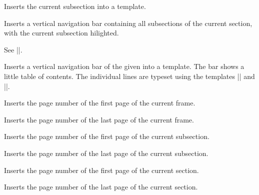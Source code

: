 \begin{command}{\insertsubsection}
  Inserts the current subsection into a template.
\end{command}

\begin{command}{\insertsubsectionnavigation{}}
  Inserts a vertical navigation bar containing all subsections of the
  current section, with the current subsection hilighted.
\end{command}

\begin{command}{\insertsubsectionnavigationhorizontal{}%
    }
  See |\insertsectionnavigationhorizontal|.
\end{command}


\begin{command}{\insertverticalnavigation{}}
  Inserts a vertical navigation bar of the given  into a
  template. The bar shows a little table of contents. The individual
  lines are typeset using the templates
  |\usesectionsidetemplate| and |\usesubsectionsidetemplate|.
\end{command}

\begin{command}{\insertframestartpage}
  Inserts the page number of the first page of the current frame.
\end{command}

\begin{command}{\insertframeendpage}
  Inserts the page number of the last page of the current frame.
\end{command}

\begin{command}{\insertsubsectionstartpage}
  Inserts the page number of the first page of the current subsection.
\end{command}

\begin{command}{\insertsubsectionendpage}
  Inserts the page number of the last page of the current subsection.
\end{command}

\begin{command}{\insertsectionstartpage}
  Inserts the page number of the first page of the current section.
\end{command}

\begin{command}{\insertsectionendpage}
  Inserts the page number of the last page of the current section.
\end{command}

